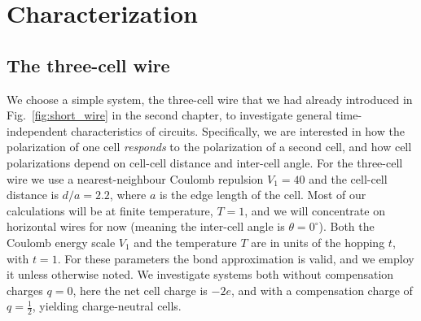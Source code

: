 \chapter{Characterization}
\graphicspath{{../gfx/chapter03/}{../plots/chapter03/}}


\section{The three-cell wire}

We choose a simple  system, the three-cell wire that we had already
introduced in Fig.~\ref{fig:short_wire} in the second chapter, to investigate
general time-independent characteristics of  circuits. Specifically,
we are interested in how the polarization of one cell \emph{responds} to the
polarization of a second cell, and how cell polarizations depend on cell-cell
distance and inter-cell angle. For the three-cell wire we use a
nearest-neighbour Coulomb repulsion $V_1 = 40$ and the cell-cell distance is
$d/a = 2.2$, where $a$ is the edge length of the cell. Most of our calculations
will be at finite temperature, $T = 1$, and we will concentrate on horizontal
wires for now (meaning the inter-cell angle is $\theta = 0^{\circ}$). Both the
Coulomb energy scale $V_1$ and the temperature $T$ are in units of the hopping
$t$, with $t = 1$. For these parameters the bond approximation is valid, and we
employ it unless otherwise noted. We investigate systems both without
compensation charges $q = 0$, here the net cell charge is $-2e$, and with a
compensation charge of $q=\frac{1}{2}$, yielding charge-neutral cells.

